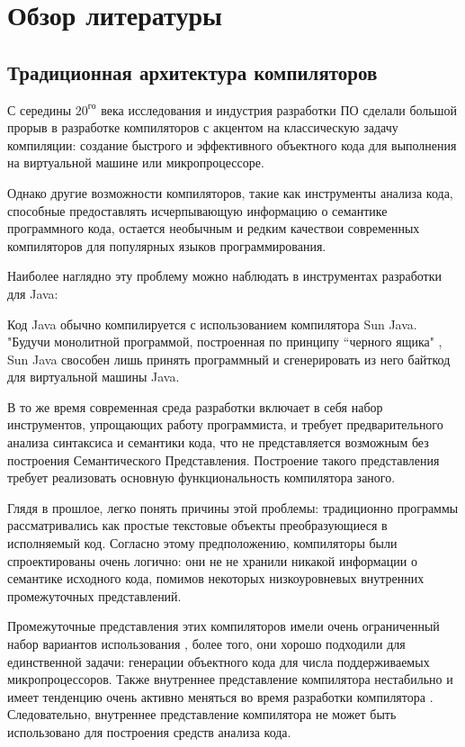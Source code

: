 \chapter{Обзор литературы}
\label{chap:lr}

\section{Традиционная архитектура компиляторов}
\label{sec:review_1}

С середины $20^{го}$ века исследования и индустрия разработки ПО сделали большой прорыв
в разработке компиляторов с акцентом на классическую задачу компиляции: 
создание быстрого и эффективного объектного кода для выполнения на виртуальной
машине или микропроцессоре.


Однако другие возможности компиляторов, такие как инструменты анализа кода, 
способные предоставлять исчерпывающую информацию о семантике программного кода,
остается необычным и редким качествои современных компиляторов для популярных языков программирования.

Наиболее наглядно эту проблему можно наблюдать в инструментах разработки для Java:

Код Java обычно компилируется с использованием компилятора Sun Java. "Будучи
монолитной программой, построенная по принципу ``черного ящика" \cite{Zouev2005}, 
Sun Java свособен лишь принять программный и сгенерировать из него байткод для виртуальной машины Java.


В то же время современная среда разработки включает в себя набор инструментов,
упрощающих работу программиста, и требует предварительного анализа синтаксиса и семантики кода, 
что не представляется возможным без построения Семантического Представления\cite{Zouev2005}. 
Построение такого представления требует реализовать основную функциональность компилятора заного.


Глядя в прошлое, легко понять причины этой проблемы: 
традиционно программы рассматривались как простые текстовые объекты
преобразующиеся в исполняемый код. Согласно этому предположению, компиляторы
были спроектированы очень логично: они не не хранили никакой информации о семантике исходного кода, 
помимов некоторых низкоуровневых внутренних промежуточных представлений.


Промежуточные представления этих компиляторов имели очень ограниченный набор вариантов использования \cite{Zouev2005, Zouev2010}, более того, они
хорошо подходили для единственной задачи: генерации объектного кода для числа поддерживаемых микропроцессоров. 
Также внутреннее представление компилятора нестабильно и имеет тенденцию очень активно меняться
во время разработки компилятора \cite{FreeSoftwareFoundation2016}. Следовательно, внутреннее представление компилятора не может 
быть использовано для построения средств анализа кода.

